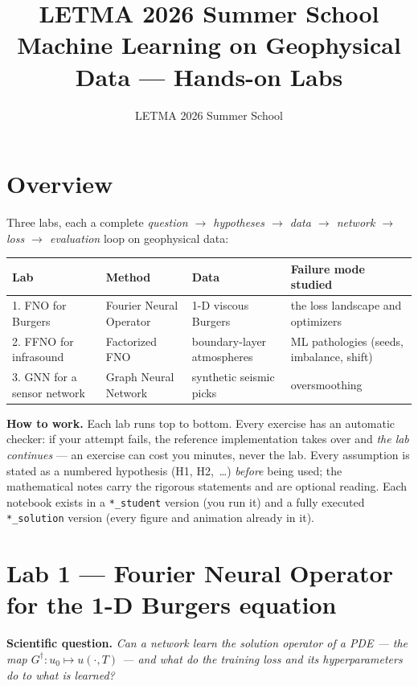 \documentclass[11pt,a4paper]{article}
\title{\vspace{-1.2cm}\textbf{LETMA 2026 Summer School}\\[2pt]
\textbf{Machine Learning on Geophysical Data --- Hands-on Labs}}
\author{\small LETMA 2026 Summer School}
\date{}
\newcommand{\labq}[1]{\medskip\noindent\textbf{\textcolor{black!55}{Scientific question.}} \textit{#1}\par}
\begin{document}
\maketitle
\vspace{-6mm}

\section*{Overview}
Three labs, each a complete \emph{question $\rightarrow$ hypotheses $\rightarrow$ data $\rightarrow$ network $\rightarrow$ loss $\rightarrow$ evaluation} loop on geophysical data:
\begin{center}
\begin{tabular}{@{}llll@{}}
\toprule
\textbf{Lab} & \textbf{Method} & \textbf{Data} & \textbf{Failure mode studied}\\
\midrule
1. FNO for Burgers & Fourier Neural Operator & 1-D viscous Burgers & the loss landscape and optimizers\\
2. FFNO for infrasound & Factorized FNO & boundary-layer atmospheres & ML pathologies (seeds, imbalance, shift)\\
3. GNN for a sensor network & Graph Neural Network & synthetic seismic picks & oversmoothing\\
\bottomrule
\end{tabular}
\end{center}

\textbf{How to work.} Each lab runs top to bottom.
Every exercise has an automatic checker: if your attempt fails, the reference implementation
takes over and \emph{the lab continues} --- an exercise can cost you minutes, never the lab.
Every assumption is stated as a numbered hypothesis (H1, H2,~\ldots) \emph{before} being used;
the mathematical notes carry the rigorous statements and are optional reading.
Each notebook exists in a \texttt{*\_student} version (you run it) and a fully executed
\texttt{*\_solution} version (every figure and animation already in it).

\section{Lab 1 --- Fourier Neural Operator for the 1-D Burgers equation}

\labq{Can a network learn the \emph{solution operator} of a PDE --- the map
$G^\dagger: u_0 \mapsto u(\cdot,T)$ --- and what do the training loss and its hyperparameters
do to what is learned?}
\end{document}
